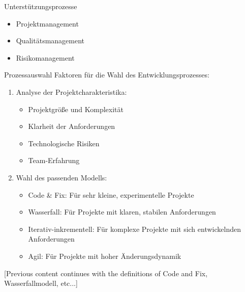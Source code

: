 \begin{corollary}{Unterstützungsprozesse}
\begin{itemize}
    \item Projektmanagement
    \item Qualitätsmanagement
    \item Risikomanagement
\end{itemize}
\end{corollary}

\begin{KR}{Prozessauswahl}
Faktoren für die Wahl des Entwicklungsprozesses:
\begin{enumerate}
    \item Analyse der Projektcharakteristika:
    \begin{itemize}
        \item Projektgröße und Komplexität
        \item Klarheit der Anforderungen
        \item Technologische Risiken
        \item Team-Erfahrung
    \end{itemize}
    \item Wahl des passenden Modells:
    \begin{itemize}
        \item Code \& Fix: Für sehr kleine, experimentelle Projekte
        \item Wasserfall: Für Projekte mit klaren, stabilen Anforderungen
        \item Iterativ-inkrementell: Für komplexe Projekte mit sich entwickelnden Anforderungen
        \item Agil: Für Projekte mit hoher Änderungsdynamik
    \end{itemize}
\end{enumerate}
\end{KR}

[Previous content continues with the definitions of Code and Fix, Wasserfallmodell, etc...]

